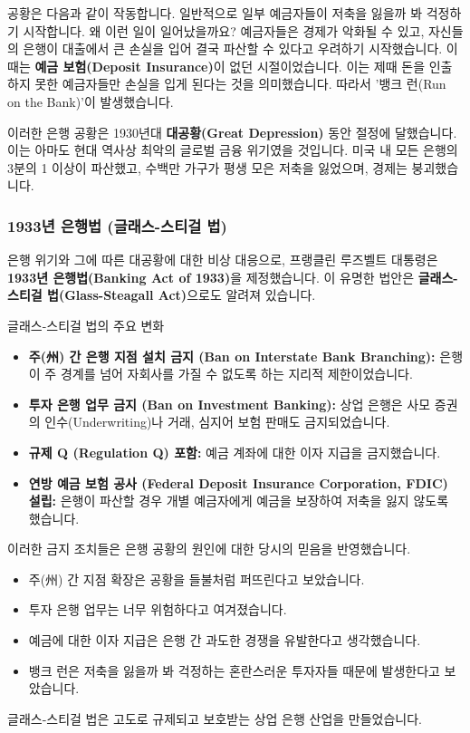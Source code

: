 \documentclass[11pt,a4paper]{article}
\theoremstyle{definition}
\begin{document}
공황은 다음과 같이 작동합니다. 일반적으로 일부 예금자들이 저축을 잃을까 봐 걱정하기 시작합니다. 왜 이런 일이 일어났을까요? 예금자들은 경제가 악화될 수 있고, 자신들의 은행이 대출에서 큰 손실을 입어 결국 파산할 수 있다고 우려하기 시작했습니다. 이때는 \textbf{예금 보험(Deposit Insurance)}이 없던 시절이었습니다. 이는 제때 돈을 인출하지 못한 예금자들만 손실을 입게 된다는 것을 의미했습니다. 따라서 '뱅크 런(Run on the Bank)'이 발생했습니다.

이러한 은행 공황은 1930년대 \textbf{대공황(Great Depression)} 동안 절정에 달했습니다. 이는 아마도 현대 역사상 최악의 글로벌 금융 위기였을 것입니다. 미국 내 모든 은행의 3분의 1 이상이 파산했고, 수백만 가구가 평생 모은 저축을 잃었으며, 경제는 붕괴했습니다.

\subsubsection*{1933년 은행법 (글래스-스티걸 법)}
은행 위기와 그에 따른 대공황에 대한 비상 대응으로, 프랭클린 루즈벨트 대통령은 \textbf{1933년 은행법(Banking Act of 1933)}을 제정했습니다. 이 유명한 법안은 \textbf{글래스-스티걸 법(Glass-Steagall Act)}으로도 알려져 있습니다.

\begin{summarybox}{글래스-스티걸 법의 주요 변화}
\begin{itemize}
    \item \textbf{주(州) 간 은행 지점 설치 금지 (Ban on Interstate Bank Branching):} 은행이 주 경계를 넘어 자회사를 가질 수 없도록 하는 지리적 제한이었습니다.
    \item \textbf{투자 은행 업무 금지 (Ban on Investment Banking):} 상업 은행은 사모 증권의 인수(Underwriting)나 거래, 심지어 보험 판매도 금지되었습니다.
    \item \textbf{규제 Q (Regulation Q) 포함:} 예금 계좌에 대한 이자 지급을 금지했습니다.
    \item \textbf{연방 예금 보험 공사 (Federal Deposit Insurance Corporation, FDIC) 설립:} 은행이 파산할 경우 개별 예금자에게 예금을 보장하여 저축을 잃지 않도록 했습니다.
\end{itemize}
\end{summarybox}

이러한 금지 조치들은 은행 공황의 원인에 대한 당시의 믿음을 반영했습니다.
\begin{itemize}
    \item 주(州) 간 지점 확장은 공황을 들불처럼 퍼뜨린다고 보았습니다.
    \item 투자 은행 업무는 너무 위험하다고 여겨졌습니다.
    \item 예금에 대한 이자 지급은 은행 간 과도한 경쟁을 유발한다고 생각했습니다.
    \item 뱅크 런은 저축을 잃을까 봐 걱정하는 혼란스러운 투자자들 때문에 발생한다고 보았습니다.
\end{itemize}
글래스-스티걸 법은 고도로 규제되고 보호받는 상업 은행 산업을 만들었습니다.
\end{document}
